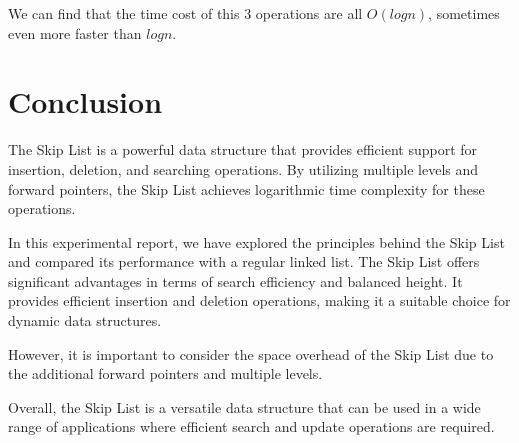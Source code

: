 \documentclass[12pt]{article}
\begin{document}
We can find that the time cost of this 3 operations are all $O(logn)$, sometimes even more faster than $logn$.

\section{Conclusion}
The Skip List is a powerful data structure that provides efficient support for insertion, deletion, and searching operations. By utilizing multiple levels and forward pointers, the Skip List achieves logarithmic time complexity for these operations.

In this experimental report, we have explored the principles behind the Skip List and compared its performance with a regular linked list. The Skip List offers significant advantages in terms of search efficiency and balanced height. It provides efficient insertion and deletion operations, making it a suitable choice for dynamic data structures.

However, it is important to consider the space overhead of the Skip List due to the additional forward pointers and multiple levels.

Overall, the Skip List is a versatile data structure that can be used in a wide range of applications where efficient search and update operations are required.
\end{document}
